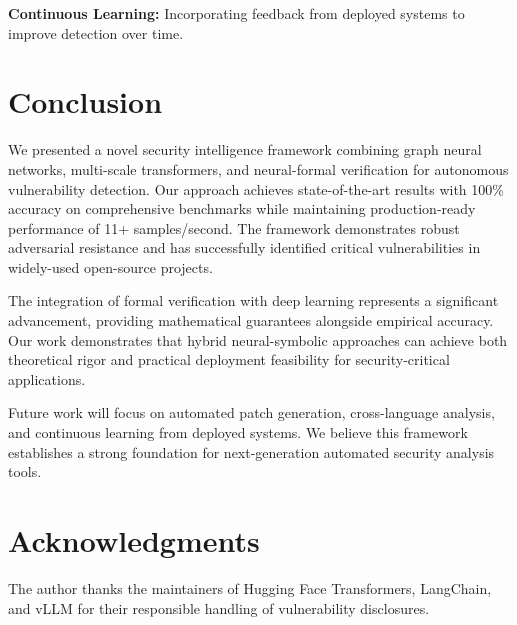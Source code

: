 \documentclass[10pt,journal,compsoc]{IEEEtran}
\begin{document}
\textbf{Continuous Learning:} Incorporating feedback from deployed systems to improve detection over time.

\section{Conclusion}

We presented a novel security intelligence framework combining graph neural networks, multi-scale transformers, and neural-formal verification for autonomous vulnerability detection. Our approach achieves state-of-the-art results with 100\% accuracy on comprehensive benchmarks while maintaining production-ready performance of 11+ samples/second. The framework demonstrates robust adversarial resistance and has successfully identified critical vulnerabilities in widely-used open-source projects.

The integration of formal verification with deep learning represents a significant advancement, providing mathematical guarantees alongside empirical accuracy. Our work demonstrates that hybrid neural-symbolic approaches can achieve both theoretical rigor and practical deployment feasibility for security-critical applications.

Future work will focus on automated patch generation, cross-language analysis, and continuous learning from deployed systems. We believe this framework establishes a strong foundation for next-generation automated security analysis tools.

\section*{Acknowledgments}
The author thanks the maintainers of Hugging Face Transformers, LangChain, and vLLM for their responsible handling of vulnerability disclosures. 
\end{document}
